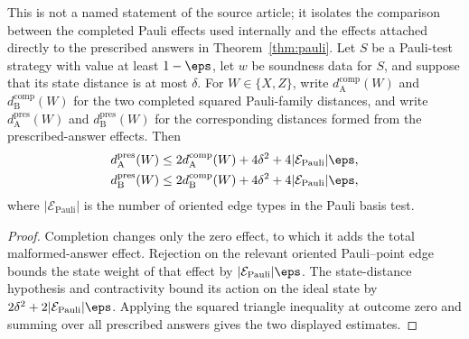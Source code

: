 \begin{theorem}
  \label{thm:pauli-prescribed-answer-transfer-support}
  \leanok
  This is not a named statement of the source article; it isolates the
  comparison between the completed Pauli effects used internally and the
  effects attached directly to the prescribed answers in
  Theorem~\ref{thm:pauli}. Let $S$ be a Pauli-test strategy with value at least
  $1-\eps$, let $w$ be soundness data for $S$, and suppose that its state
  distance is at most $\delta$. For $W\in\{X,Z\}$, write
  $d_{\mathrm A}^{\mathrm{comp}}(W)$ and
  $d_{\mathrm B}^{\mathrm{comp}}(W)$ for the two completed squared
  Pauli-family distances, and write $d_{\mathrm A}^{\mathrm{pres}}(W)$ and
  $d_{\mathrm B}^{\mathrm{pres}}(W)$ for the corresponding distances formed
  from the prescribed-answer effects. Then
  \begin{align*}
    d_{\mathrm A}^{\mathrm{pres}}(W)
      &\leq 2d_{\mathrm A}^{\mathrm{comp}}(W)+4\delta^2
        +4|\mathcal E_{\mathrm{Pauli}}|\eps,\\
    d_{\mathrm B}^{\mathrm{pres}}(W)
      &\leq 2d_{\mathrm B}^{\mathrm{comp}}(W)+4\delta^2
        +4|\mathcal E_{\mathrm{Pauli}}|\eps,
  \end{align*}
  where $|\mathcal E_{\mathrm{Pauli}}|$ is the number of oriented edge types in
  the Pauli basis test.
\end{theorem}
\begin{proof}
  \leanok
  Completion changes only the zero effect, to which it adds the total
  malformed-answer effect. Rejection on the relevant oriented Pauli--point
  edge bounds the state weight of that effect by
  $|\mathcal E_{\mathrm{Pauli}}|\eps$. The state-distance hypothesis and
  contractivity bound its action on the ideal state by
  $2\delta^2+2|\mathcal E_{\mathrm{Pauli}}|\eps$. Applying the squared triangle
  inequality at outcome zero and summing over all prescribed answers gives the
  two displayed estimates.
\end{proof}

